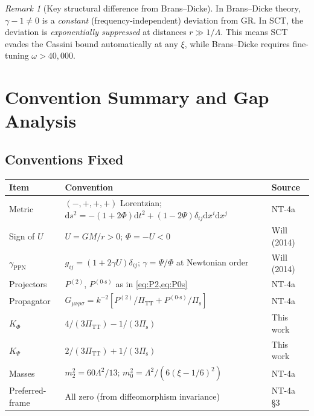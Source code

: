 \documentclass[11pt,a4paper]{article}
\theoremstyle{plain}
\theoremstyle{definition}
\theoremstyle{remark}
\newtheorem{remark}[theorem]{Remark}
\renewcommand{\dd}{\mathrm{d}}
\begin{document}
\begin{remark}[Key structural difference from Brans--Dicke]
In Brans--Dicke theory, $\gamma - 1 \neq 0$ is a
\emph{constant} (frequency-independent) deviation from GR.  In SCT,
the deviation is \emph{exponentially suppressed} at distances
$r \gg 1/\Lambda$.  This means SCT evades the Cassini bound
automatically at any $\xi$, while Brans--Dicke requires fine-tuning
$\omega > 40{,}000$.
\end{remark}

\section{Convention Summary and Gap Analysis}\label{sec:summary}

\subsection{Conventions Fixed}

\begin{center}
\begin{longtable}{lp{8cm}l}
\toprule
Item & Convention & Source \\
\midrule
\endhead
Metric & $(-,+,+,+)$ Lorentzian; $\dd s^2 = -(1+2\Phi)\dd t^2
  + (1-2\Psi)\delta_{ij}\dd x^i\dd x^j$ & NT-4a \\
Sign of $U$ & $U = GM/r > 0$; $\Phi = -U < 0$ & Will (2014) \\
$\gamma_{\mathrm{PPN}}$ & $g_{ij} = (1+2\gamma U)\delta_{ij}$;
  $\gamma = \Psi/\Phi$ at Newtonian order & Will (2014) \\
Projectors & $P^{(2)}$, $P^{(0\text{-s})}$ as in
  \cref{eq:P2,eq:P0s} & NT-4a \\
Propagator & $G_{\mu\nu\rho\sigma} = k^{-2}
  [P^{(2)}/\Pi_{\mathrm{TT}} + P^{(0\text{-s})}/\Pi_{\mathrm{s}}]$
  & NT-4a \\
$K_\Phi$ & $4/(3\Pi_{\mathrm{TT}}) - 1/(3\Pi_{\mathrm{s}})$ &
  This work \\
$K_\Psi$ & $2/(3\Pi_{\mathrm{TT}}) + 1/(3\Pi_{\mathrm{s}})$ &
  This work \\
Masses & $m_2^2 = 60\Lambda^2/13$;
  $m_0^2 = \Lambda^2/(6(\xi-1/6)^2)$ & NT-4a \\
Preferred-frame & All zero (from diffeomorphism invariance) &
  NT-4a \S3 \\
\bottomrule
\end{longtable}
\end{center}
\end{document}
